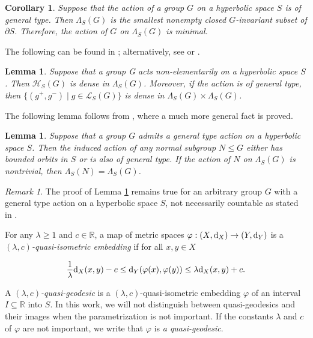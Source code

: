 \documentclass[11pt,letterpaper]{article}
\newcommand{\RR}{\mathbb{R}}
\renewcommand{\d}{{\rm d}}
\renewcommand{\d}{{\rm d}}
\renewcommand{\phi}{\varphi}
\newtheorem{cor}[thm]{Corollary}
\newtheorem{lem}[thm]{Lemma}
\theoremstyle{definition}
\theoremstyle{remark}
\newtheorem{rem}[thm]{Remark}
\begin{document}
\begin{cor}\cite[Corollary 7.4.1]{DSU}\label{action on the limit set is minimal}
Suppose that the action of a group $G$ on a hyperbolic space $S$ is of general type. Then $\Lambda_S(G)$ is the smallest nonempty closed $G$-invariant subset of $\partial S$. Therefore, the action of $G$ on $\Lambda_S(G)$ is minimal.
\end{cor}

The following can be found in \cite[Section 8.2]{Gro87}; alternatively, see \cite[Theorems 2.6, 2.9]{Ham} or \cite[Propositions 7.4.6, 7.4.7]{DSU}.

\begin{lem}\label{set of fixed points of loxodromic elements is dense}
Suppose that a group G acts non-elementarily on a hyperbolic space $S$. Then $\mathcal{H}_S(G)$ is dense in $\Lambda_S(G)$. Moreover, if the action is of general type, then $\{(g^+, g^-) \mid g \in \mathcal{L}_S(G)\}$ is dense in $\Lambda_S(G) \times \Lambda_S(G)$.
\end{lem}

The following lemma follows from \cite[Theorem 4.5]{Osi17}, where a much more general fact is proved.

\begin{lem}\label{dichotomy}
Suppose that a group $G$ admits a general type action on a hyperbolic space $S$. Then the induced action of any normal subgroup $N \leq G$ either has bounded orbits in $S$ or is also of general type. If the action of $N$ on $\Lambda_S(G)$ is nontrivial, then $\Lambda_S(N)=\Lambda_S(G)$.
\end{lem}

\begin{rem}
The proof of Lemma \ref{dichotomy} remains true for an arbitrary group $G$ with a general type action on a hyperbolic space $S$, not necessarily countable as stated in \cite[Theorem 4.5]{Osi17}.
\end{rem}

For any $\lambda \geq 1$ and $c\in \RR$, a map of metric spaces $\phi:\left(X, \d_X\right) \rightarrow\left(Y, \d_Y\right)$ is a {\it $(\lambda, c)$-quasi-isometric embedding} if for all $x, y \in X$

$$
\frac{1}{\lambda} \d_X(x, y)-c \leq \d_Y(\phi(x), \phi(y)) \leq \lambda \d_X(x, y)+c.
$$

A {\it $(\lambda, c)$-quasi-geodesic} is a $(\lambda, c)$-quasi-isometric embedding $\phi$ of an interval $I \subseteq \RR$ into $S$. In this work, we will not distinguish between quasi-geodesics and their images when the parametrization is not important. If the constants $\lambda$ and $c$ of $\phi$ are not important, we write that $\phi$ is {\it a quasi-geodesic}.
\end{document}

